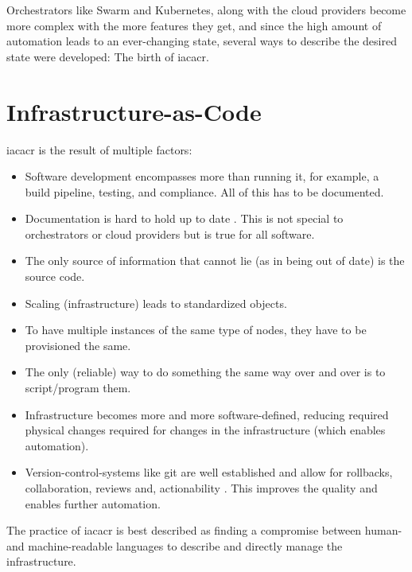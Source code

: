 \newline
Orchestrators like Swarm and Kubernetes, along with the cloud providers become more complex with the more features they get, and since the high amount of automation leads to an ever-changing state, several ways to describe the desired state were developed: The birth of \gls{iacacr}.


\section{Infrastructure-as-Code}
\Gls{iacacr} is the result of multiple factors:
\begin{itemize}
  \item Software development encompasses more than running it, for example, a build pipeline, testing, and compliance. All of this has to be documented.
  \item Documentation is hard to hold up to date \cite{software_engineers_documentation} \cite{software_documentation_issues}. This is not special to orchestrators or cloud providers but is true for all software.
  \item The only source of information that cannot lie (as in being out of date) is the source code.
  \item Scaling (infrastructure) leads to standardized objects.
  \item To have multiple instances of the same type of nodes, they have to be provisioned the same.
  \item The only (reliable) way to do something the same way over and over is to script/program them.
  \item Infrastructure becomes more and more software-defined, reducing required physical changes required for changes in the infrastructure (which enables automation).
  \item Version-control-systems like git are well established and allow for rollbacks, collaboration, reviews and, actionability \cite{iac_oreilly}. This improves the quality and enables further automation.
\end{itemize}
The practice of \gls{iacacr} is best described as finding a compromise between human- and machine-readable languages to describe and directly manage the infrastructure.
\newline
